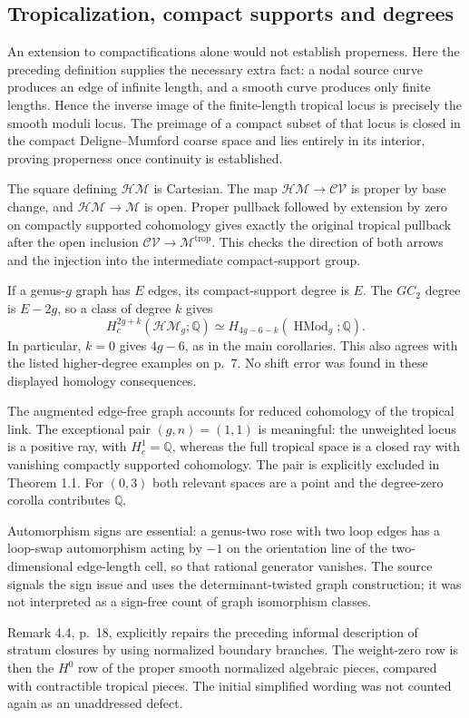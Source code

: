 \documentclass[10pt]{article}
\begin{document}
\subsection*{Tropicalization, compact supports and degrees}
An extension to compactifications alone would not establish properness. Here the preceding definition supplies the necessary extra fact: a nodal source curve produces an edge of infinite length, and a smooth curve produces only finite lengths. Hence the inverse image of the finite-length tropical locus is precisely the smooth moduli locus. The preimage of a compact subset of that locus is closed in the compact Deligne–Mumford coarse space and lies entirely in its interior, proving properness once continuity is established.\par
The square defining \(\mathcal{HM}\) is Cartesian. The map \(\mathcal{HM}\to\mathcal{CV}\) is proper by base change, and \(\mathcal{HM}\to\mathcal M\) is open. Proper pullback followed by extension by zero on compactly supported cohomology gives exactly the original tropical pullback after the open inclusion \(\mathcal{CV}\to\mathcal M^{\mathrm{trop}}\). This checks the direction of both arrows and the injection into the intermediate compact-support group.\par
If a genus-\(g\) graph has \(E\) edges, its compact-support degree is \(E\). The \(GC_2\) degree is \(E-2g\), so a class of degree \(k\) gives \[H_c^{2g+k}(\mathcal{HM}_g;\mathbb Q)
       \simeq H_{4g-6-k}(\operatorname{HMod}_g;\mathbb Q).\] In particular, \(k=0\) gives \(4g-6\), as in the main corollaries. This also agrees with the listed higher-degree examples on p. 7. No shift error was found in these displayed homology consequences.\par
The augmented edge-free graph accounts for reduced cohomology of the tropical link. The exceptional pair \((g,n)=(1,1)\) is meaningful: the unweighted locus is a positive ray, with \(H_c^1=\mathbb Q\), whereas the full tropical space is a closed ray with vanishing compactly supported cohomology. The pair is explicitly excluded in Theorem 1.1. For \((0,3)\) both relevant spaces are a point and the degree-zero corolla contributes \(\mathbb Q\).\par
Automorphism signs are essential: a genus-two rose with two loop edges has a loop-swap automorphism acting by \(-1\) on the orientation line of the two-dimensional edge-length cell, so that rational generator vanishes. The source signals the sign issue and uses the determinant-twisted graph construction; it was not interpreted as a sign-free count of graph isomorphism classes.\par
Remark 4.4, p. 18, explicitly repairs the preceding informal description of stratum closures by using normalized boundary branches. The weight-zero row is then the \(H^0\) row of the proper smooth normalized algebraic pieces, compared with contractible tropical pieces. The initial simplified wording was not counted again as an unaddressed defect.\par
\end{document}
